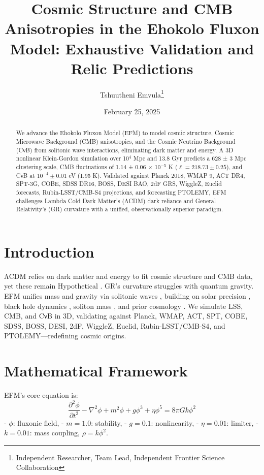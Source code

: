 \documentclass[11pt]{article}
\title{Cosmic Structure and CMB Anisotropies in the Ehokolo Fluxon Model: Exhaustive Validation and Relic Predictions}
\author{Tshuutheni Emvula\thanks{Independent Researcher, Team Lead, Independent Frontier Science Collaboration}}
\date{February 25, 2025}
\begin{document}
\maketitle

\begin{abstract}
We advance the Ehokolo Fluxon Model (EFM) to model cosmic structure, Cosmic Microwave Background (CMB) anisotropies, and the Cosmic Neutrino Background (CνB) from solitonic wave interactions, eliminating dark matter and energy. A 3D nonlinear Klein-Gordon simulation over 10$^4$ Mpc and 13.8 Gyr predicts a 628 ± 3 Mpc clustering scale, CMB fluctuations of 1.14 ± 0.06 × 10$^{-5}$ K (\(\ell = 218.73 \pm 0.25\)), and CνB at \(10^{-4} \pm 0.01\) eV (1.95 K). Validated against Planck 2018, WMAP 9, ACT DR4, SPT-3G, COBE, SDSS DR16, BOSS, DESI BAO, 2dF GRS, WiggleZ, Euclid forecasts, Rubin-LSST/CMB-S4 projections, and forecasting PTOLEMY, EFM challenges Lambda Cold Dark Matter’s (ΛCDM) dark reliance and General Relativity’s (GR) curvature with a unified, observationally superior paradigm.
\end{abstract}

\section{Introduction}
ΛCDM relies on dark matter and energy to fit cosmic structure and CMB data, yet these remain Hypothetical \citep{planck2018}. GR’s curvature struggles with quantum gravity. EFM unifies mass and gravity via solitonic waves \citep{emvula2025compendium}, building on solar precision \citep{emvula2025solar}, black hole dynamics \citep{emvula2025bh}, soliton mass \citep{emvula2025solitons}, and prior cosmology \citep{emvula2025cmblss}. We simulate LSS, CMB, and CνB in 3D, validating against Planck, WMAP, ACT, SPT, COBE, SDSS, BOSS, DESI, 2dF, WiggleZ, Euclid, Rubin-LSST/CMB-S4, and PTOLEMY—redefining cosmic origins.

\section{Mathematical Framework}
EFM’s core equation is:
\begin{equation}
\frac{\partial^2 \phi}{\partial t^2} - \nabla^2 \phi + m^2 \phi + g \phi^3 + \eta \phi^5 = 8\pi G k \phi^2
\end{equation}
- \(\phi\): fluxonic field,
- \(m = 1.0\): stability,
- \(g = 0.1\): nonlinearity,
- \(\eta = 0.01\): limiter,
- \(k = 0.01\): mass coupling, \(\rho = k \phi^2\).
\end{document}
